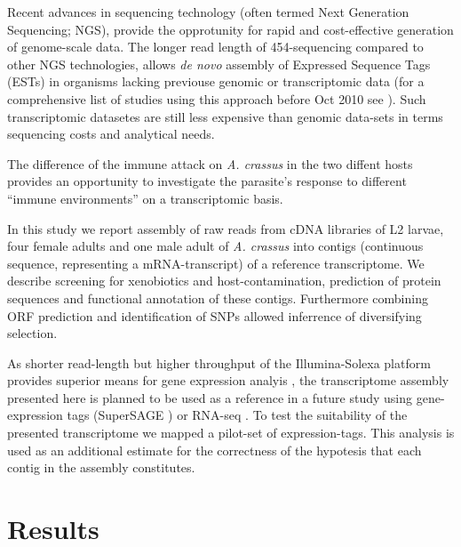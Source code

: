 \documentclass[10pt]{bmc_article}
\newenvironment{bmcformat}{\begin{raggedright}\baselineskip20pt\sloppy\setboolean{publ}{false}}{\end{raggedright}\baselineskip20pt\sloppy}
\begin{document}
\begin{bmcformat}
Recent advances in sequencing technology (often termed Next Generation
Sequencing; NGS), provide the opprotunity for rapid and cost-effective
generation of genome-scale data. The longer read length of
454-sequencing \cite{pmid16056220} compared to other NGS technologies,
allows \textit{de novo} assembly of Expressed Sequence Tags (ESTs) in
organisms lacking previouse genomic or transcriptomic data (for a
comprehensive list of studies using this approach before Oct 2010 see
\cite{pmid20950480}). Such transcriptomic datasetes are still less
expensive than genomic data-sets in terms sequencing costs and
analytical needs.

The difference of the immune attack on \textit{A. crassus} in the two
diffent hosts provides an opportunity to investigate the parasite's
response to different ``immune environments'' on a transcriptomic
basis.

In this study we report assembly of raw reads from cDNA libraries of
L2 larvae, four female adults and one male adult of
\textit{A. crassus} into contigs (continuous sequence, representing a
mRNA-transcript) of a reference transcriptome. We describe screening
for xenobiotics and host-contamination, prediction of protein
sequences and functional annotation of these contigs. Furthermore
combining ORF prediction and identification of SNPs allowed inferrence
of diversifying selection.


As shorter read-length but higher throughput of the Illumina-Solexa
platform provides superior means for gene expression analyis
\cite{pmid21627854}, the transcriptome assembly presented here is
planned to be used as a reference in a future study using
gene-expression tags (SuperSAGE \cite{pmid20967605}) or RNA-seq
\cite{pmid19015660}. To test the suitability of the presented
transcriptome we mapped a pilot-set of expression-tags. This analysis
is used as an additional estimate for the correctness of the hypotesis
that each contig in the assembly constitutes.

\section*{Results}



\end{bmcformat}
\end{document}
